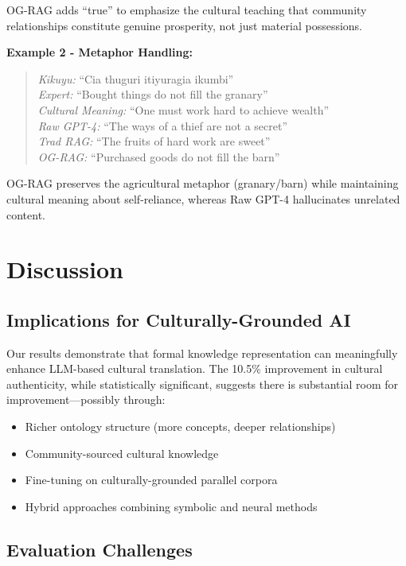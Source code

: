 \documentclass[sigconf,nonacm]{acmart}
\begin{document}
OG-RAG adds ``true'' to emphasize the cultural teaching that community relationships constitute genuine prosperity, not just material possessions.

\textbf{Example 2 - Metaphor Handling:}

\begin{quote}
\textit{Kikuyu:} ``Cia thuguri itiyuragia ikumbi''\\
\textit{Expert:} ``Bought things do not fill the granary''\\
\textit{Cultural Meaning:} ``One must work hard to achieve wealth''\\
\textit{Raw GPT-4:} ``The ways of a thief are not a secret''\\
\textit{Trad RAG:} ``The fruits of hard work are sweet''\\
\textit{OG-RAG:} ``Purchased goods do not fill the barn''
\end{quote}

OG-RAG preserves the agricultural metaphor (granary/barn) while maintaining cultural meaning about self-reliance, whereas Raw GPT-4 hallucinates unrelated content.

\section{Discussion}

\subsection{Implications for Culturally-Grounded AI}

Our results demonstrate that formal knowledge representation can meaningfully enhance LLM-based cultural translation. The 10.5\% improvement in cultural authenticity, while statistically significant, suggests there is substantial room for improvement---possibly through:

\begin{itemize}
    \item Richer ontology structure (more concepts, deeper relationships)
    \item Community-sourced cultural knowledge
    \item Fine-tuning on culturally-grounded parallel corpora
    \item Hybrid approaches combining symbolic and neural methods
\end{itemize}

\subsection{Evaluation Challenges}
\label{sec:limitations}
\end{document}

